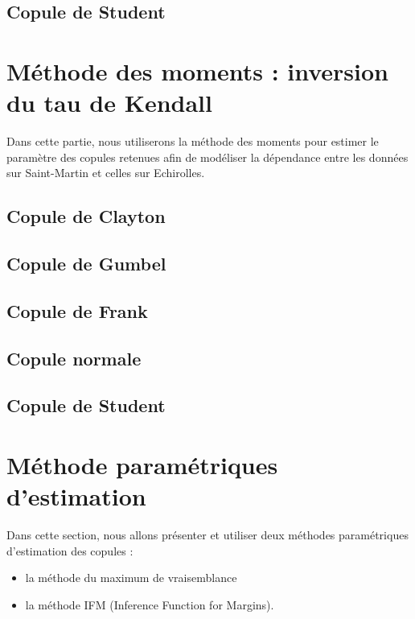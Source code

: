 \subsection{Copule de Student}

\section{Méthode des moments : inversion du tau de Kendall}

Dans cette partie, nous utiliserons la méthode des moments pour estimer le paramètre des copules retenues afin de modéliser la dépendance entre les données sur Saint-Martin et celles sur Echirolles.

\subsection{Copule de Clayton}

\subsection{Copule de Gumbel}

\subsection{Copule de Frank}

\subsection{Copule normale}

\subsection{Copule de Student}


\section{Méthode paramétriques d'estimation}

Dans cette section, nous allons présenter et utiliser deux méthodes paramétriques d'estimation
des copules :

\begin{itemize}
\item la méthode du maximum de vraisemblance
\item la méthode IFM (Inference Function for Margins).
\end{itemize}

